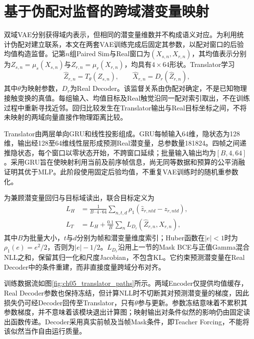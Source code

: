 \section{基于伪配对监督的跨域潜变量映射}
\label{sec:ch05_latent_translator}

双域VAE分别获得域内表示，但相同的潜变量维数并不构成语义对应。为利用统计伪配对建立联系，本文在两套VAE训练完成后固定其参数，以配对窗口的后验均值构造监督。记第$n$组Paired Sim与Real窗口为$(X_{s,n},X_{r,n})$，其均值表示分别为$Z_{s,n}=\mu_s(X_{s,n})$与$Z_{r,n}=\mu_r(X_{r,n})$，均具有$4\times64$形状。Translator学习
\begin{equation}
 \widehat Z_{r,n}=T_\theta(Z_{s,n}),\qquad
 \widehat X_{r,n}=D_r(\widehat Z_{r,n}),
 \label{eq:ch05_translator_mapping}
\end{equation}
其中$\theta$为映射参数，$D_r$为Real Decoder。该监督关系由伪配对确定，不是已知物理接触变换的真值。每组输入、均值目标及Real触觉沿同一配对索引取出，不在训练过程中重新寻找近邻。回归比较发生在Translator输出与Real目标坐标之间，不将未映射的两域向量直接作物理距离比较。

Translator由两层单向GRU和线性投影组成。GRU每帧输入64维，隐状态为128维，输出经128至64维线性层形成预测Real潜变量，总参数量181824。四帧之间递推隐状态，每个窗口以零状态开始，不跨窗口延续；批量输入输出均为$[B,4,64]$。采用GRU旨在使映射利用当前及前序帧信息，尚无同等数据和预算的公平消融证明其优于MLP。此阶段使用固定后验均值，不重复VAE训练时的随机重参数化。

为兼顾潜变量回归与目标域读出，联合目标定义为
\begin{equation}
 \begin{aligned}
 L_H&=\frac1{B\cdot4\cdot64}\sum_{n,t,d}
 \rho_1(\widehat z_{r,ntd}-z_{r,ntd}),\\
 L_T&=L_H+\frac{0.1}{B}\sum_n
 L_{D_r}(\widehat Z_{r,n},X_{r,n}),
 \end{aligned}
 \label{eq:ch05_translator_objective}
\end{equation}
其中$B$为批量大小，$t$与$d$分别为帧和潜变量维度索引；Huber函数在$|e|<1$时为$\rho_1(e)=e^2/2$，否则为$|e|-1/2$。$L_{D_r}$沿用上一节的Mask BCE与正值Gamma混合NLL之和，保留其归一化和尺度Jacobian，不包含KL。它约束预测潜变量在Real Decoder中的条件重建，而非直接度量跨域分布对齐。

训练数据流如图\ref{fig:ch05_translator_paths}所示。两域Encoder仅提供均值缓存，Real Decoder参数也保持冻结，但计算NLL时不切断其对预测潜变量的梯度，因此损失仍可经Decoder回传至Translator，只有$\theta$参与更新。参数冻结意味着不累积其参数梯度，并不意味着该模块退出计算图；映射输出对条件似然的影响仍由固定读出函数传递。Decoder采用真实前帧及当帧Mask条件，即Teacher Forcing，不能将该似然当作自由运行质量。

